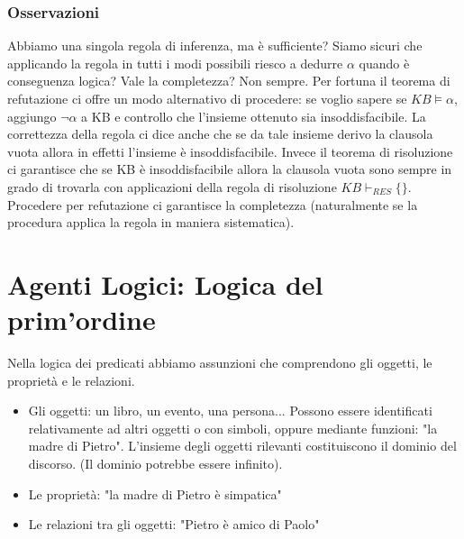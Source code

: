 \documentclass{article}
\begin{document}
\subsubsection{Osservazioni}
Abbiamo una singola regola di inferenza, ma è sufficiente? Siamo sicuri che applicando la regola in tutti i modi possibili riesco a dedurre $\alpha$ quando è conseguenza logica? Vale la completezza? Non sempre. \newline
Per fortuna il teorema di refutazione ci offre un modo alternativo di procedere: se voglio sapere se $KB \models \alpha$, aggiungo $\neg \alpha$ a KB e controllo che l’insieme ottenuto sia insoddisfacibile. La correttezza della regola ci dice anche che se da tale insieme derivo la clausola vuota allora in effetti l’insieme è insoddisfacibile. Invece il teorema di risoluzione ci garantisce che se KB è insoddisfacibile allora la clausola vuota sono sempre in grado di trovarla con applicazioni della regola di risoluzione $KB \vdash _{RES} \{\}$. \newline 
Procedere per refutazione ci garantisce la completezza (naturalmente se la procedura applica la regola in maniera sistematica).

\section{Agenti Logici: Logica del prim'ordine}
Nella logica dei predicati abbiamo assunzioni che comprendono gli oggetti, le proprietà e le relazioni. 
\begin{itemize}
    \item Gli oggetti: un libro, un evento, una persona... Possono essere identificati relativamente ad altri oggetti o con simboli, oppure mediante funzioni: "la madre di Pietro". L’insieme degli oggetti rilevanti costituiscono il dominio del discorso. (Il dominio potrebbe essere infinito).
    \item Le proprietà: "la madre di Pietro è simpatica"
    \item Le relazioni tra gli oggetti: "Pietro è amico di Paolo"
\end{itemize} 
\end{document}
